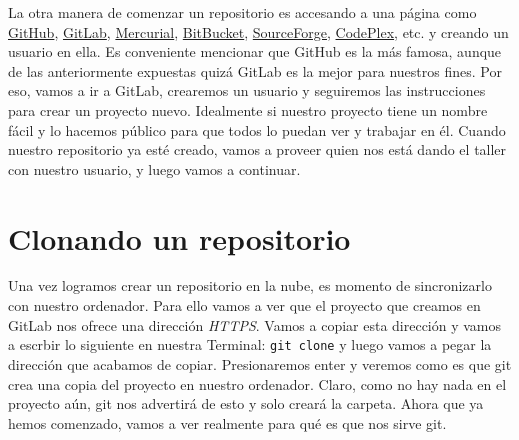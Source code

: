\documentclass[10pt,letterpaper]{article}
\newcommand{\inlinecode}[1]{
\colorbox{light-gray}{\texttt{#1}}
}
\begin{document}
La otra manera de comenzar un repositorio es accesando a una p\'agina como \href{https://github.com/}{GitHub}, \href{https://gitlab.com/}{GitLab}, \href{https://mercurial.selenic.com/}{Mercurial}, \href{https://bitbucket.org/}{BitBucket}, \href{http://sourceforge.net/}{SourceForge}, \href{http://www.codeplex.com/}{CodePlex}, etc. y creando un usuario en ella. Es conveniente mencionar que GitHub es la m\'as famosa, aunque de las anteriormente expuestas quiz\'a GitLab es la mejor para nuestros fines. Por eso, vamos a ir a GitLab, crearemos un usuario y seguiremos las instrucciones para crear un proyecto nuevo. Idealmente si nuestro proyecto tiene un nombre f\'acil y lo hacemos p\'ublico para que todos lo puedan ver y trabajar en \'el. Cuando nuestro repositorio ya est\'e creado, vamos a proveer quien nos est\'a dando el taller con nuestro usuario, y luego vamos a continuar.

\section{Clonando un repositorio}
Una vez logramos crear un repositorio en la nube, es momento de sincronizarlo con nuestro ordenador. Para ello vamos a ver que el proyecto que creamos en GitLab nos ofrece una direcci\'on \emph{HTTPS}. Vamos a copiar esta direcci\'on y vamos a escrbir lo siguiente en nuestra Terminal: \inlinecode{git clone} y luego vamos a pegar la direcci\'on que acabamos de copiar. Presionaremos enter y veremos como es que git crea una copia del proyecto en nuestro ordenador. Claro, como no hay nada en el proyecto a\'un, git nos advertir\'a de esto y solo crear\'a la carpeta. Ahora que ya hemos comenzado, vamos a ver realmente para qu\'e es que nos sirve git. 
\end{document}

